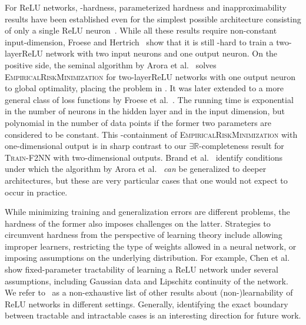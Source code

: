 \documentclass[11pt]{article}
\numberwithin{equation}{section}
\theoremstyle{definition}
\theoremstyle{plain}
\newcommand{\R}{\mathbb R}
\newcommand{\ER}{\texorpdfstring{\ensuremath{\exists\R}}{ER}\xspace}
\newcommand{\problemname}[1]{\textnormal{\textsc{#1}}\xspace}
\newcommand{\trainNN}{\problemname{Train-F2NN}}
\newcommand{\ERM}{\problemname{EmpiricalRiskMinimization}}
\newcommand{\twolayer}{two-layer\xspace}
\newcommand{\ReLU}{\ensuremath{\mathrm{ReLU}}\xspace}
\theoremstyle{plain}
\begin{document}
For \ReLU networks, \NP-hardness, parameterized hardness and inapproximability results have been established even for the simplest possible architecture consisting of only a single \ReLU neuron~\cite{Boob2022_Complexity, Dey2020_Approximation, Froese2022_Parameterized, Goel2021_Hardness}.  %
While all these results require non-constant input-dimension, Froese and Hertrich~\cite{Froese2023_FixedDimension} show that it is still \NP-hard to train a \twolayer \ReLU network with two input neurons and one output neuron.
On the positive side, the seminal algorithm by Arora et al.~\cite{Arora2018_Understanding} solves \ERM for \twolayer \ReLU networks with one output neuron to global optimality, placing the problem in \NP.
It was later extended to a more general class of loss functions by Froese et al.~\cite{Froese2022_Parameterized}.
The running time is exponential in the number of neurons in the hidden layer and in the input dimension, but polynomial in the number of data points if the former two parameters are considered to be constant.
This \NP-containment of \ERM with one-dimensional output is in sharp contrast to our \ER-completeness result for \trainNN with two-dimensional outputs.
Brand et al.~\cite{brand2023new} identify conditions under which the algorithm by Arora et al.~\cite{Arora2018_Understanding} \emph{can} be generalized to deeper architectures, but these are very %
particular  %
cases that one would not expect to occur in practice.

While minimizing training and generalization errors are different problems, the hardness of the former also imposes challenges on the latter.
Strategies to circumvent hardness from the perspective of learning theory include allowing improper learners, restricting the type of weights allowed in a neural network, or imposing assumptions on the underlying distribution.
For example, Chen et al.~\cite{Chen2022_LearningFTP} show fixed-parameter tractability of learning a \ReLU network under several assumptions, including Gaussian data and Lipschitz continuity of the network.
We refer to~\cite{Bakshi2019_Learning, Chen2022_Hardness, Diakonikolas2020_Approximation, Goel2017_ReliablyLearning, Goel2019_Learning, Goel2018_Learning}
%
as a non-exhaustive list of other results about (non-)learnability of \ReLU networks in different settings. Generally, identifying the exact boundary between tractable and intractable cases is an interesting direction for future work.
\end{document}
